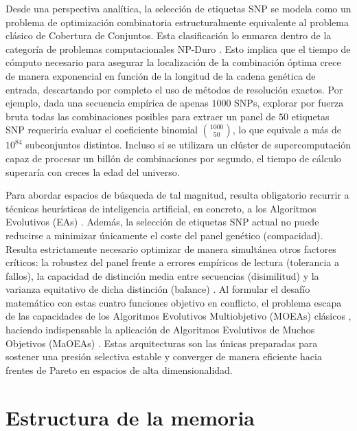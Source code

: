 Desde una perspectiva analítica, la selección de etiquetas SNP se modela como un problema de optimización combinatoria estructuralmente equivalente al problema clásico de Cobertura de Conjuntos. Esta clasificación lo enmarca dentro de la categoría de problemas computacionales NP-Duro \cite{bafna2003haplotypes}. Esto implica que el tiempo de cómputo necesario para asegurar la localización de la combinación óptima crece de manera exponencial en función de la longitud de la cadena genética de entrada, descartando por completo el uso de métodos de resolución exactos. Por ejemplo, dada una secuencia empírica de apenas $1000$ SNPs, explorar por fuerza bruta todas las combinaciones posibles para extraer un panel de $50$ etiquetas SNP requeriría evaluar el coeficiente binomial $\binom{1000}{50}$, lo que equivale a más de $10^{84}$ subconjuntos distintos. Incluso si se utilizara un clúster de supercomputación capaz de procesar un billón de combinaciones por segundo, el tiempo de cálculo superaría con creces la edad del universo.

Para abordar espacios de búsqueda de tal magnitud, resulta obligatorio recurrir a técnicas heurísticas de inteligencia artificial, en concreto, a los Algoritmos Evolutivos (EAs) \cite{ting2010multi}. Además, la selección de etiquetas SNP actual no puede reducirse a minimizar únicamente el coste del panel genético (compacidad). Resulta estrictamente necesario optimizar de manera simultánea otros factores críticos: la robustez del panel frente a errores empíricos de lectura (tolerancia a fallos), la capacidad de distinción media entre secuencias (disimilitud) y la varianza equitativo de dicha distinción (balance) \cite{ting2010multi, moqa2022assessing}. Al formular el desafío matemático con estas cuatro funciones objetivo en conflicto, el problema escapa de las capacidades de los Algoritmos Evolutivos Multiobjetivo (MOEAs) clásicos \cite{ishibuchi2008evolutionary}, haciendo indispensable la aplicación de Algoritmos Evolutivos de Muchos Objetivos (MaOEAs) \cite{moqa2022assessing}. Estas arquitecturas son las únicas preparadas para sostener una presión selectiva estable y converger de manera eficiente hacia frentes de Pareto en espacios de alta dimensionalidad.

\section{Estructura de la memoria}

